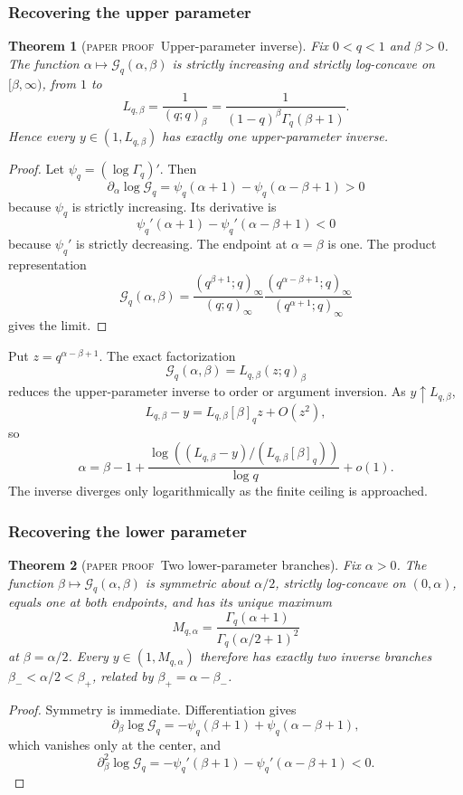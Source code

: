 \documentclass[11pt,oneside]{article}
\newtheorem{theorem}{Theorem}[section]
\theoremstyle{definition}
\theoremstyle{remark}
\theoremstyle{plain}
\theoremstyle{definition}
\theoremstyle{remark}
\newcommand{\statusproved}{\textcolor{provedgreen}{\textsc{paper proof}}}
\numberwithin{equation}{section}
\numberwithin{figure}{section}
\numberwithin{table}{section}
\let\reportsubsubsection\subsubsection
\let\subsection\reportsubsubsection
\begin{document}
\subsection{Recovering the upper parameter}
\begin{theorem}[\statusproved\ Upper-parameter inverse]
Fix \(0<q<1\) and \(\beta>0\).  The function
\(\alpha\mapsto\mathcal G_q(\alpha,\beta)\) is strictly increasing and strictly
log-concave on \([\beta,\infty)\), from \(1\) to
\begin{equation}
 L_{q,\beta}=\frac1{(q;q)_\beta}
 =\frac1{(1-q)^\beta\Gamma_q(\beta+1)}.
 \label{eq:upper-limit}
\end{equation}
Hence every \(y\in(1,L_{q,\beta})\) has exactly one upper-parameter inverse.
\end{theorem}
\begin{proof}
Let \(\psi_q=(\log\Gamma_q)'\).  Then
\[
 \partial_\alpha\log\mathcal G_q
 =\psi_q(\alpha+1)-\psi_q(\alpha-\beta+1)>0
\]
because \(\psi_q\) is strictly increasing.  Its derivative is
\[
 \psi_q'(\alpha+1)-\psi_q'(\alpha-\beta+1)<0
\]
because \(\psi_q'\) is strictly decreasing.  The endpoint at
\(\alpha=\beta\) is one.  The product representation
\[
 \mathcal G_q(\alpha,\beta)
 =\frac{(q^{\beta+1};q)_\infty}{(q;q)_\infty}
 \frac{(q^{\alpha-\beta+1};q)_\infty}
 {(q^{\alpha+1};q)_\infty}
\]
gives the limit.
\end{proof}

Put \(z=q^{\alpha-\beta+1}\).  The exact factorization
\[
 \mathcal G_q(\alpha,\beta)=L_{q,\beta}(z;q)_\beta
\]
reduces the upper-parameter inverse to order or argument inversion.  As
\(y\uparrow L_{q,\beta}\),
\[
 L_{q,\beta}-y
 =L_{q,\beta}[\beta]_qz+O(z^2),
\]
so
\begin{equation}
 \alpha=\beta-1+
 \frac{\log\!\left((L_{q,\beta}-y)/(L_{q,\beta}[\beta]_q)\right)}{\log q}
 +o(1).
 \label{eq:alpha-inverse-endpoint}
\end{equation}
The inverse diverges only logarithmically as the finite ceiling is approached.

\subsection{Recovering the lower parameter}
\begin{theorem}[\statusproved\ Two lower-parameter branches]
Fix \(\alpha>0\).  The function
\(\beta\mapsto\mathcal G_q(\alpha,\beta)\) is symmetric about
\(\alpha/2\), strictly log-concave on \((0,\alpha)\), equals one at both
endpoints, and has its unique maximum
\[
 M_{q,\alpha}
 =\frac{\Gamma_q(\alpha+1)}{\Gamma_q(\alpha/2+1)^2}
\]
at \(\beta=\alpha/2\).  Every \(y\in(1,M_{q,\alpha})\) therefore has exactly
two inverse branches \(\beta_-<\alpha/2<\beta_+\), related by
\(\beta_+=\alpha-\beta_-\).
\end{theorem}
\begin{proof}
Symmetry is immediate.  Differentiation gives
\[
 \partial_\beta\log\mathcal G_q
 =-\psi_q(\beta+1)+\psi_q(\alpha-\beta+1),
\]
which vanishes only at the center, and
\[
 \partial_\beta^2\log\mathcal G_q
 =-\psi_q'(\beta+1)-\psi_q'(\alpha-\beta+1)<0.
\]
\end{proof}
\end{document}
